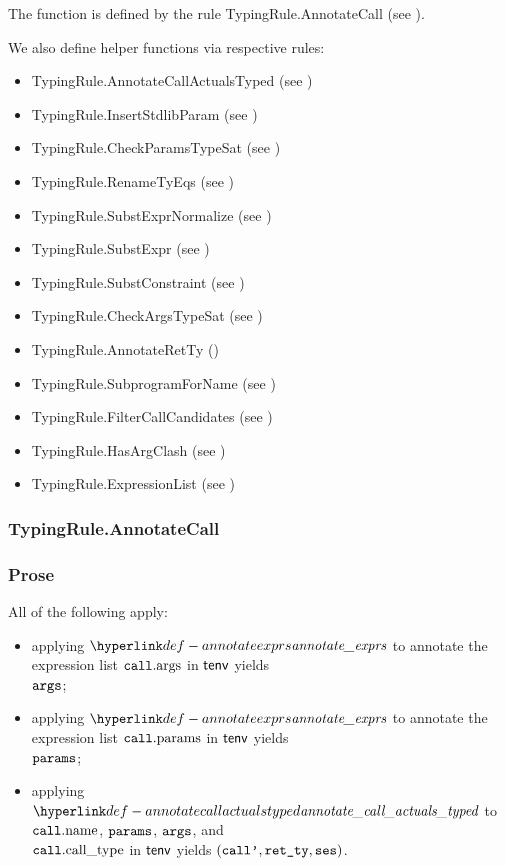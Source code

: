 The function is defined by the rule TypingRule.AnnotateCall (see ).

We also define helper functions via respective rules:
\begin{itemize}
  \item TypingRule.AnnotateCallActualsTyped (see )
  \item TypingRule.InsertStdlibParam (see )
  \item TypingRule.CheckParamsTypeSat (see )
  \item TypingRule.RenameTyEqs (see )
  \item TypingRule.SubstExprNormalize (see )
  \item TypingRule.SubstExpr (see )
  \item TypingRule.SubstConstraint (see )
  \item TypingRule.CheckArgsTypeSat (see )
  \item TypingRule.AnnotateRetTy ()
  \item TypingRule.SubprogramForName (see )
  \item TypingRule.FilterCallCandidates (see )
  \item TypingRule.HasArgClash (see )
  \item TypingRule.ExpressionList (see )
\end{itemize}

\subsubsection{TypingRule.AnnotateCall\label{sec:TypingRule.AnnotateCall}}
\subsubsection{Prose}
All of the following apply:
\begin{itemize}
  \item applying $\annotateexprlist$ to annotate the expression list $\texttt{call}.\text{args}$ in $\textsf{tenv}$ yields \\
        $\texttt{args}$\ProseOrTypeError;
  \item applying $\annotateexprlist$ to annotate the expression list $\texttt{call}.\text{params}$ in $\textsf{tenv}$ yields \\
        $\texttt{params}$\ProseOrTypeError;
  \item applying $\annotatecallactualstyped$ to $\texttt{call}.\text{name}$, $\texttt{params}$, $\texttt{args}$, and \\
        $\texttt{call}.\text{call\_type}$ in $\textsf{tenv}$ yields $(\texttt{call'}, \texttt{ret\_ty}, \texttt{ses})$\ProseOrTypeError.
\end{itemize}

